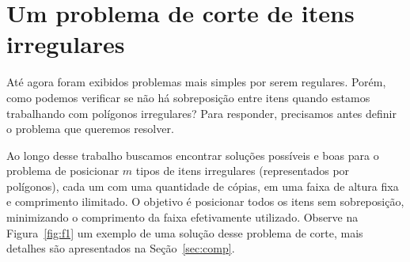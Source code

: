 \documentclass{article}
\begin{document}
\section{Um problema de corte de itens irregulares} \label{sec:irregular}

Até agora foram exibidos problemas mais simples por serem regulares. Porém, como podemos verificar se não há sobreposição entre itens quando estamos trabalhando com polígonos irregulares? Para responder, precisamos antes definir o problema que queremos resolver.

Ao longo desse trabalho buscamos encontrar soluções possíveis e boas para o problema de posicionar $m$ tipos de itens irregulares (representados por polígonos), cada um com uma quantidade de cópias, em uma faixa de altura fixa e comprimento ilimitado. O objetivo é  posicionar todos os itens sem sobreposição, minimizando o comprimento da faixa efetivamente utilizado. Observe na Figura~\ref{fig:f1} um exemplo de uma solução desse problema de corte, mais detalhes são apresentados na Seção~\ref{sec:comp}.
\end{document}
